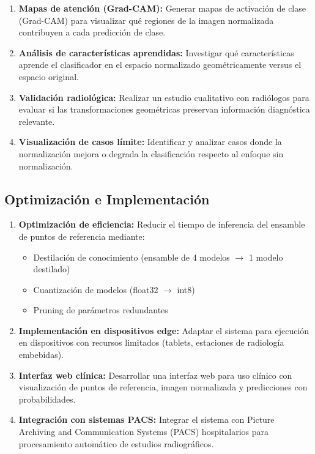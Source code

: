 \begin{enumerate}
    \item \textbf{Mapas de atención (Grad-CAM):} Generar mapas de activación de clase (Grad-CAM) para visualizar qué regiones de la imagen normalizada contribuyen a cada predicción de clase.

    \item \textbf{Análisis de características aprendidas:} Investigar qué características aprende el clasificador en el espacio normalizado geométricamente versus el espacio original.

    \item \textbf{Validación radiológica:} Realizar un estudio cualitativo con radiólogos para evaluar si las transformaciones geométricas preservan información diagnóstica relevante.

    \item \textbf{Visualización de casos límite:} Identificar y analizar casos donde la normalización mejora o degrada la clasificación respecto al enfoque sin normalización.
\end{enumerate}

\subsection{Optimización e Implementación}
\label{subsec:trabajos_futuros_optimizacion}

\begin{enumerate}
    \item \textbf{Optimización de eficiencia:} Reducir el tiempo de inferencia del ensamble de puntos de referencia mediante:
    \begin{itemize}
        \item Destilación de conocimiento (ensamble de 4 modelos $\rightarrow$ 1 modelo destilado)
        \item Cuantización de modelos (float32 $\rightarrow$ int8)
        \item Pruning de parámetros redundantes
    \end{itemize}

    \item \textbf{Implementación en dispositivos edge:} Adaptar el sistema para ejecución en dispositivos con recursos limitados (tablets, estaciones de radiología embebidas).

    \item \textbf{Interfaz web clínica:} Desarrollar una interfaz web para uso clínico con visualización de puntos de referencia, imagen normalizada y predicciones con probabilidades.

    \item \textbf{Integración con sistemas PACS:} Integrar el sistema con Picture Archiving and Communication Systems (PACS) hospitalarios para procesamiento automático de estudios radiográficos.
\end{enumerate}

